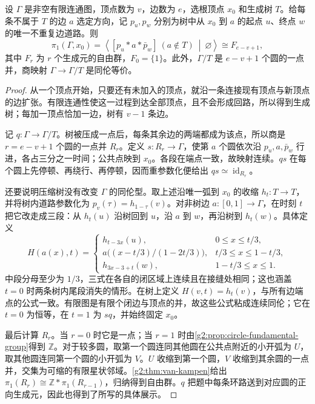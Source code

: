 \begin{theorem}\label{g2:thm:graph-free-group}
	设 \(\Gamma\) 是非空有限连通图，顶点数为 \(v\)，边数为 \(e\)，选根顶点 \(x_0\) 和生成树 \(T\)。给每条不属于 \(T\) 的边 \(a\) 选定方向，记 \(p_u,p_w\) 分别为树中从 \(x_0\) 到 \(a\) 的起点 \(u\)、终点 \(w\) 的唯一不重复边道路。则
	\[
		\pi_1(\Gamma,x_0)
		=\left\langle [p_u*a*\bar p_w]\ (a\notin T)\ \middle|\ \varnothing\right\rangle
		\cong F_{e-v+1},
	\]
	其中 \(F_r\) 为 \(r\) 个生成元的自由群，\(F_0=\{1\}\)。此外，\(\Gamma/T\) 是 \(e-v+1\) 个圆的一点并，商映射 \(\Gamma\rightarrow\Gamma/T\) 是同伦等价。
\end{theorem}
\begin{proof}
	从一个顶点开始，只要还有未加入的顶点，就沿一条连接现有顶点与新顶点的边扩张。有限连通性使这一过程到达全部顶点，且不会形成回路，所以得到生成树；每加一顶点恰加一边，树有 \(v-1\) 条边。

	记 \(q:\Gamma\rightarrow\Gamma/T\)。树被压成一点后，每条其余边的两端都成为该点，所以商是 \(r=e-v+1\) 个圆的一点并 \(R_r\)。定义 \(s:R_r\rightarrow\Gamma\)，使第 \(a\) 个圆依次沿 \(p_u,a,\bar p_w\) 行进，各占三分之一时间；公共点映到 \(x_0\)。各段在端点一致，故映射连续。\(qs\) 在每个圆上先停顿、再绕行、再停顿，因而重参数化便给出 \(qs\simeq\operatorname{id}_{R_r}\)。

	还要说明压缩树没有改变 \(\Gamma\) 的同伦型。取上述沿唯一弧到 \(x_0\) 的收缩 \(h_t:T\rightarrow T\)，并将树内道路参数化为 \(p_v(\tau)=h_{1-\tau}(v)\)。对非树边 \(a:[0,1]\rightarrow\Gamma\)，在时刻 \(t\) 把它改走成三段：从 \(h_t(u)\) 沿树回到 \(u\)，沿 \(a\) 到 \(w\)，再沿树到 \(h_t(w)\)。具体定义
	\[
		H(a(x),t)=
		\begin{cases}
			h_{t-3x}(u),&0\leq x\leq t/3,\\
			a\bigl((x-t/3)/(1-2t/3)\bigr),&t/3\leq x\leq1-t/3,\\
			h_{3x-3+t}(w),&1-t/3\leq x\leq1.
		\end{cases}
	\]
	中段分母至少为 \(1/3\)，三式在各自的闭区域上连续且在接缝处相同；这也涵盖 \(t=0\) 时两条树内尾段消失的情形。在树上定义 \(H(v,t)=h_t(v)\)，与所有边端点的公式一致。有限图是有限个闭边与顶点的并，故这些公式粘成连续同伦；它在 \(t=0\) 为恒等，在 \(t=1\) 为 \(sq\)，并始终固定 \(x_0\)。

	最后计算 \(R_r\)。当 \(r=0\) 时它是一点；当 \(r=1\) 时由\cref{g2:prop:circle-fundamental-group}得到 \(\mathbb Z\)。对于较多圆，取第一个圆连同其他圆在公共点附近的小开弧为 \(U\)，取其他圆连同第一个圆的小开弧为 \(V\)。\(U\) 收缩到第一个圆，\(V\) 收缩到其余圆的一点并，交集为可缩的有限星状邻域。\cref{g2:thm:van-kampen}给出 \(\pi_1(R_r)\cong\mathbb Z*\pi_1(R_{r-1})\)，归纳得到自由群。\(q\) 把题中每条环路送到对应圆的正向生成元，因此也得到了所写的具体展示。
\end{proof}

